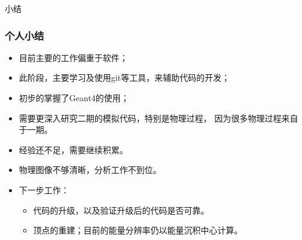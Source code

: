 \begin{frame}
    \begin{center}
        \LARGE 小结
    \end{center}
\end{frame}

\begin{frame}
    \frametitle{个人小结}
    \begin{itemize}
        \item 目前主要的工作偏重于软件；
        \item 此阶段，主要学习及使用git等工具，来辅助代码的开发；
        \item 初步的掌握了Geant4的使用；
        \item 需要更深入研究二期的模拟代码，特别是物理过程，
              因为很多物理过程来自于一期。
        \item 经验还不足，需要继续积累。
        \item 物理图像不够清晰，分析工作不到位。
        \item 下一步工作：
            \begin{itemize}
                \item 代码的升级，以及验证升级后的代码是否可靠。
                \item 顶点的重建；目前的能量分辨率仍以能量沉积中心计算。
            \end{itemize}
    \end{itemize}
\end{frame}
